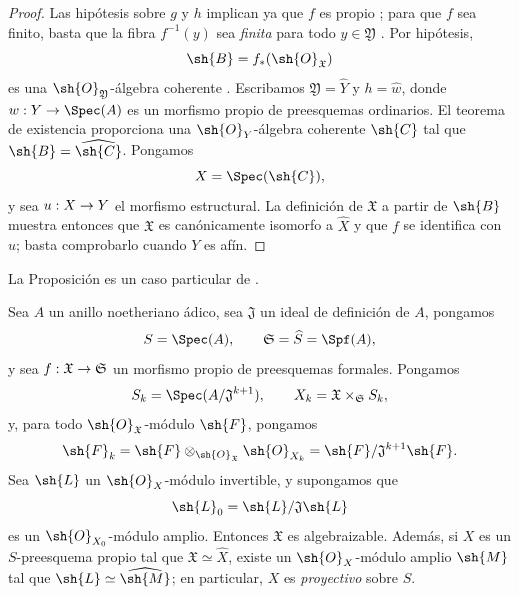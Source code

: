 \documentclass[oneside]{amsart}
\makeatletter
\newcommand{\ega@arrow}[2]{\mathchoice{#1}{#2}{#2}{#2}}
\renewcommand{\to}{\ega@arrow{\longrightarrow}{\rightarrow}}
\newcommand{\oldpage}[2][]{{\marginnote{\normalfont\textbf{#1}~|~#2}}\ignorespaces}
\let\EGAOriginalLabel\label
\renewcommand{\label}[1]{\phantomsection\EGAOriginalLabel{#1}}
\makeatother
\begin{document}
\begin{proof}
Las hipótesis sobre $g$ y $h$ implican ya que $f$ es propio
; para que $f$ sea finito, basta que la fibra
$f^{-1}(y)$ sea \emph{finita} para todo $y\in\mathfrak{Y}$
. Por hipótesis,
\[
  \sh{B}=f_*(\sh{O}_{\mathfrak{X}})
\]
es una $\sh{O}_{\mathfrak{Y}}$-álgebra coherente
. Escribamos
$\mathfrak{Y}=\widehat{Y}$ y $h=\widehat{w}$, donde
$w:Y\to\Spec(A)$ es un morfismo propio de preesquemas ordinarios. El
teorema de existencia proporciona una $\sh{O}_Y$-álgebra coherente $\sh{C}$
tal que $\sh{B}=\widehat{\sh{C}}$. Pongamos
\[
  X=\Spec(\sh{C}),
\]
y sea $u:X\to Y$ el morfismo estructural. La definición de
$\mathfrak{X}$ a partir de $\sh{B}$  muestra entonces que
$\mathfrak{X}$ es canónicamente isomorfo a $\widehat{X}$ y
que $f$ se identifica con $\widehat{u}$; basta comprobarlo
cuando $Y$ es afín.
\end{proof}

La Proposición  es un caso particular de
.

\begin{theorem}[5.4.5]
\label{III.5.4.5}
Sea $A$ un anillo noetheriano ádico, sea $\mathfrak{J}$ un ideal
de definición de $A$, pongamos
\[
  S=\Spec(A),\qquad
  \mathfrak{S}=\widehat{S}=\Spf(A),
\]
y sea $f:\mathfrak{X}\to\mathfrak{S}$ un morfismo propio de
preesquemas formales. Pongamos
\[
  S_k=\Spec(A/\mathfrak{J}^{k+1}),\qquad
  X_k=\mathfrak{X}\times_{\mathfrak{S}}S_k,
\]
y, para todo $\sh{O}_{\mathfrak{X}}$-módulo $\sh{F}$, pongamos
\[
  \sh{F}_k
  =\sh{F}\otimes_{\sh{O}_{\mathfrak{X}}}\sh{O}_{X_k}
  =\sh{F}/\mathfrak{J}^{k+1}\sh{F}.
\]
\oldpage[III]{158}
Sea $\sh{L}$ un
$\sh{O}_X$-módulo invertible, y supongamos que
\[
  \sh{L}_0=\sh{L}/\mathfrak{J}\sh{L}
\]
es un $\sh{O}_{X_0}$-módulo amplio. Entonces $\mathfrak{X}$ es
algebraizable. Además, si $X$ es un $S$-preesquema propio tal
que $\mathfrak{X}\simeq\widehat{X}$, existe un
$\sh{O}_X$-módulo amplio $\sh{M}$ tal que
$\sh{L}\simeq\widehat{\sh{M}}$; en particular, $X$ es \emph{proyectivo}
sobre $S$.
\end{theorem}
\end{document}

